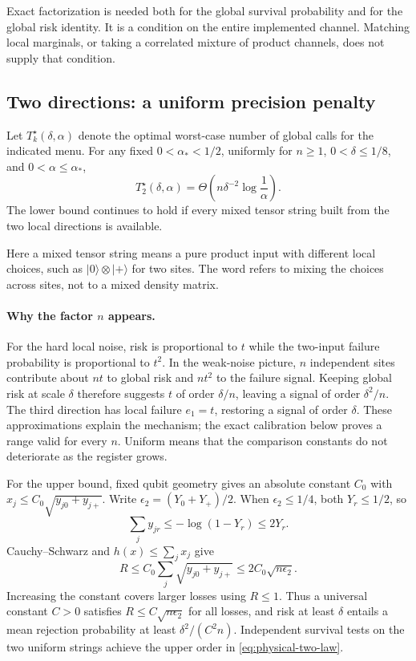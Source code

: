 \documentclass[11pt,a4paper]{article}
\newcommand{\ket}[1]{\lvert #1\rangle}
\numberwithin{equation}{section}
\begin{document}
Exact factorization is needed both for the global survival probability and for the global risk identity. It is a condition on the entire implemented channel. Matching local marginals, or taking a correlated mixture of product channels, does not supply that condition.

\subsection{Two directions: a uniform precision penalty}

Let $T_k^\star(\delta,\alpha)$ denote the optimal worst-case number of global calls for the indicated menu. For any fixed $0<\alpha_*<1/2$, uniformly for $n\ge1$, $0<\delta\le1/8$, and $0<\alpha\le\alpha_*$,
\begin{equation}
 T_2^\star(\delta,\alpha)
 =\Theta\!\left(n\delta^{-2}\log\frac1\alpha\right).
 \label{eq:physical-two-law}
\end{equation}
The lower bound continues to hold if every mixed tensor string built from the two local directions is available.

Here a mixed tensor string means a pure product input with different local
choices, such as $\ket0\otimes\ket+$ for two sites. The word refers to
mixing the choices across sites, not to a mixed density matrix.

\paragraph{Why the factor $n$ appears.}
For the hard local noise, risk is proportional to $t$ while the two-input
failure probability is proportional to $t^2$. In the weak-noise picture,
$n$ independent sites contribute about $nt$ to global risk and $nt^2$ to
the failure signal. Keeping global risk at scale $\delta$ therefore suggests
$t$ of order $\delta/n$, leaving a signal of order $\delta^2/n$.
The third direction has local failure $e_1=t$, restoring a signal of order
$\delta$. These approximations explain the mechanism; the exact calibration
below proves a range valid for every $n$. Uniform means that the comparison
constants do not deteriorate as the register grows.

For the upper bound, fixed qubit geometry gives an absolute constant $C_0$ with
$x_j\le C_0\sqrt{y_{j0}+y_{j+}}$. Write $\epsilon_2=(Y_0+Y_+)/2$. When $\epsilon_2\le1/4$, both $Y_r\le1/2$, so
\[
 \sum_jy_{jr}\le-\log(1-Y_r)\le2Y_r.
\]
Cauchy--Schwarz and $h(x)\le\sum_jx_j$ give
\[
 R\le C_0\sum_j\sqrt{y_{j0}+y_{j+}}
 \le2C_0\sqrt{n\epsilon_2}.
\]
Increasing the constant covers larger losses using $R\le1$. Thus a universal constant $C>0$ satisfies $R\le C\sqrt{n\epsilon_2}$ for all losses, and risk at least $\delta$ entails a mean rejection probability at least $\delta^2/(C^2n)$. Independent survival tests on the two uniform strings achieve the upper order in \eqref{eq:physical-two-law}.
\end{document}
